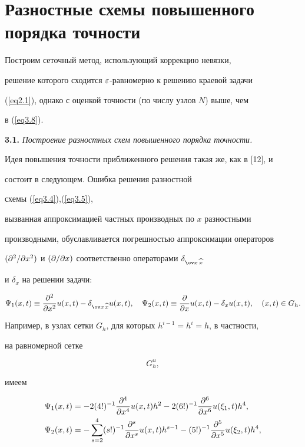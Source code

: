 \section{Разностные схемы повышенного порядка точности}





Построим сеточный метод, использующий коррекцию невязки,


решение которого сходится $\varepsilon$-равномерно к решению краевой задачи


(\ref{eq2.1}), однако с оценкой точности (по числу узлов $N$) выше, чем


в (\ref{eq3.8}).


\medskip





{\bf 3.1.} {\it Построение разностных схем повышенного порядка точности.}


Идея повышения точности приближенного решения такая же, как в [12], и


состоит в следующем. Ошибка решения разностной


схемы (\ref{eq3.4}),\;(\ref{eq3.5}),


вызванная аппроксимацией частных производных по $x$ разностными


производными, обуславливается погрешностью аппроксимации операторов


$(\partial^2/\partial x^2)$ и $(\partial/\partial x)$ соответственно операторами $\dex$


и $\delta_x$ на решении задачи:


$$


\Psi_1(x,t)\equiv \frac{\pa^2}{\pa x^2}u(x,t)-\dex u(x,t), \quad


\Psi_2(x,t)\equiv \frac{\pa}{\pa x}u(x,t)-\delta_x u(x,t),\quad


(x,t)\in G_h.


$$


Например, в узлах сетки $G_h$, для которых $h^{i-1}=h^i=h$, в частности,


на равномерной сетке


\begin{equation}


\label{eq4.1}


G^u_h,


\end{equation}


имеем


\begin{align*}


\Psi_1(x,t)&=-2(4!)^{-1}\frac{\pa^4}{\pa x^4}u(x,t) h^2-2(6!)^{-1}


\frac{\pa^6} {\pa x^6}u(\xi_1,t)h^4,\\


\Psi_2(x,t)&=-\sum_{s=2}^{4}(s!)^{-1}\frac{\pa^s}{\pa x^s}


u(x,t)h^{s-1}-(5!)^{-1}\frac{\pa^5}{\pa x^5}u(\xi_2,t)h^4,


\end{align*}


